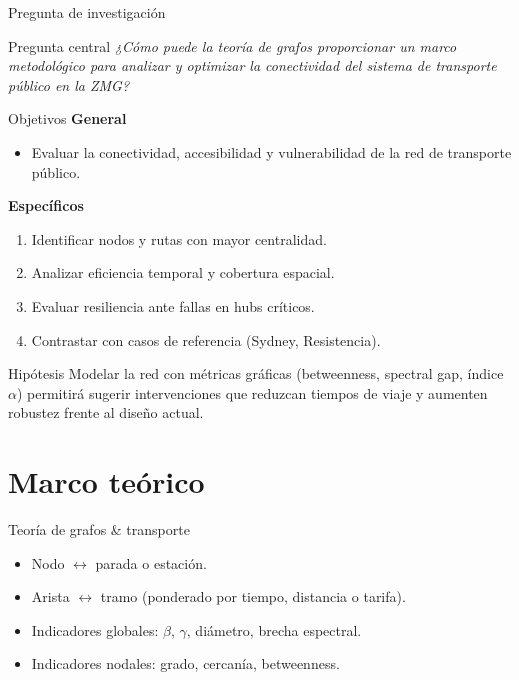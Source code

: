 \documentclass[aspectratio=169,spanish]{beamer}
\begin{document}
\begin{frame}{Pregunta de investigación}
  \begin{block}{Pregunta central}
    \centering
    \emph{¿Cómo puede la teoría de grafos proporcionar un marco metodológico para analizar y optimizar la conectividad del sistema de transporte público en la ZMG?}
  \end{block}
\end{frame}

\begin{frame}{Objetivos}
  \textbf{General}
  \begin{itemize}
    \item Evaluar la conectividad, accesibilidad y vulnerabilidad de la red de transporte público.
  \end{itemize}
  \vspace{0.4cm}
  \textbf{Específicos}
  \begin{enumerate}
    \item Identificar nodos y rutas con mayor centralidad.
    \item Analizar eficiencia temporal y cobertura espacial.
    \item Evaluar resiliencia ante fallas en hubs críticos.
    \item Contrastar con casos de referencia (Sydney, Resistencia).
  \end{enumerate}
\end{frame}

\begin{frame}{Hipótesis}
  Modelar la red con métricas gráficas (betweenness, spectral gap, índice $\alpha$) permitirá sugerir intervenciones que reduzcan tiempos de viaje y aumenten robustez frente al diseño actual.
\end{frame}

\section{Marco teórico}

\begin{frame}{Teoría de grafos \& transporte}
  \begin{itemize}
    \item Nodo $\leftrightarrow$ parada o estación.
    \item Arista $\leftrightarrow$ tramo (ponderado por tiempo, distancia o tarifa).
    \item Indicadores globales: $\beta$, $\gamma$, diámetro, brecha espectral.
    \item Indicadores nodales: grado, cercanía, betweenness.
  \end{itemize}
\end{frame}
\end{document}
